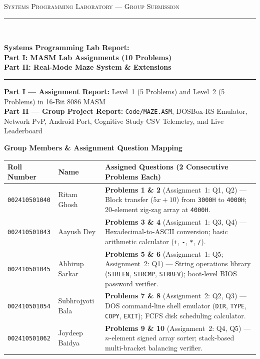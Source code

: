 \documentclass[11pt,a4paper]{article}
\begin{document}
\begin{titlepage}
    \centering
    \vspace*{0.8cm}
    {\large\scshape Systems Programming Laboratory --- Group Submission \par}
    \vspace{0.6cm}
    \rule{\linewidth}{0.6pt}\\[0.45cm]
    {\LARGE\bfseries Systems Programming Lab Report:\\[0.15cm]
    Part I: MASM Lab Assignments (10 Problems)\\[0.15cm]
    Part II: Real-Mode Maze System \& Extensions \par}
    \rule{\linewidth}{0.6pt}
    \vspace{0.9cm}

    {\normalsize\textbf{Part I --- Assignment Report:} Level~1 (5 Problems) and Level~2 (5 Problems) in 16-Bit 8086 MASM}\\[0.2cm]
    {\normalsize\textbf{Part II --- Group Project Report:} \texttt{Code/MAZE.ASM}, DOSBox-RS Emulator,\\
    Network PvP, Android Port, Cognitive Study CSV Telemetry, and Live Leaderboard}

    \vspace{1.2cm}

    {\large\bfseries Group Members \& Assignment Question Mapping}\\[0.4cm]
    \small
    \begin{tabular}{@{}llp{8.4cm}@{}}
        \toprule
        \textbf{Roll Number} & \textbf{Name} & \textbf{Assigned Questions (2 Consecutive Problems Each)} \\
        \midrule
        \texttt{002410501040} & Ritam Ghosh      & \textbf{Problems 1 \& 2} (Assignment~1: Q1, Q2) --- Block transfer ($5x+10$) from \texttt{3000H} to \texttt{4000H}; 20-element zig-zag array at \texttt{4000H}. \\[0.15cm]
        \texttt{002410501043} & Aayush Dey       & \textbf{Problems 3 \& 4} (Assignment~1: Q3, Q4) --- Hexadecimal-to-ASCII conversion; basic arithmetic calculator (\texttt{+}, \texttt{-}, \texttt{*}, \texttt{/}). \\[0.15cm]
        \texttt{002410501045} & Abhirup Sarkar   & \textbf{Problems 5 \& 6} (Assignment~1: Q5; Assignment~2: Q1) --- String operations library (\texttt{STRLEN}, \texttt{STRCMP}, \texttt{STRREV}); boot-level BIOS password verifier. \\[0.15cm]
        \texttt{002410501054} & Subhrojyoti Bala & \textbf{Problems 7 \& 8} (Assignment~2: Q2, Q3) --- DOS command-line shell emulator (\texttt{DIR}, \texttt{TYPE}, \texttt{COPY}, \texttt{EXIT}); FCFS disk scheduling calculator. \\[0.15cm]
        \texttt{002410501062} & Joydeep Baidya   & \textbf{Problems 9 \& 10} (Assignment~2: Q4, Q5) --- $n$-element signed array sorter; stack-based multi-bracket balancing verifier. \\
        \bottomrule
    \end{tabular}


\end{titlepage}
\end{document}
